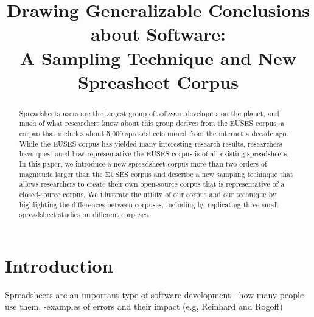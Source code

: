 \documentclass{sig-alternate} %
\begin{document}
\title{Drawing Generalizable Conclusions about Software:\\A Sampling Technique and New Spreasheet Corpus}

\maketitle

\begin{abstract}
Spreadsheets users are the largest group of software developers on
the planet, and much of what researchers know about this group derives
from the EUSES corpus, a corpus that includes about 5,000 spreadsheets
mined from the internet a decade ago.
While the EUSES corpus has yielded many interesting research results,
researchers have questioned how representative the EUSES corpus is of 
all existing spreadsheets.
In this paper, we introduce a new spreadsheet corpus more than
two orders of magnitude larger than the EUSES corpus
and describe a new sampling techinque that allows researchers to 
create their own open-source corpus that is representative of 
a closed-source corpus.
We illustrate the utility of our corpus and our technique by 
highlighting the differences between corpuses, including by
replicating three small spreadsheet studies on different
corpuses.
\end{abstract}

\section{Introduction}

Spreadsheets are an important type of software development.
-how many people use them,
-examples of errors and their impact (e.g, Reinhard and Rogoff)
\end{document}
